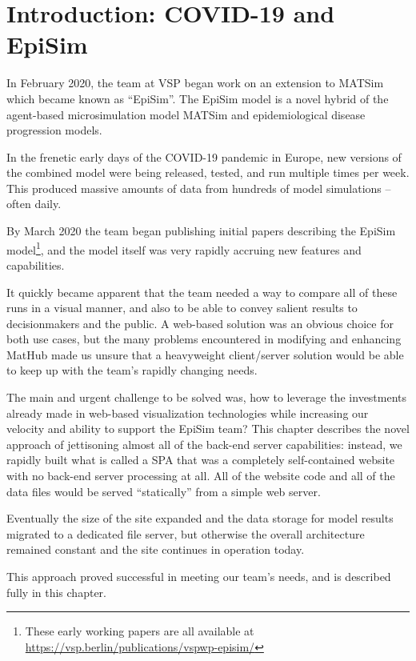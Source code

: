 \hypertarget{covid-introduction-covid-19-and-episim}{%
\section{Introduction: COVID-19 and EpiSim}\label{introduction-covid-19-and-episim}}

In February 2020, the team at VSP began work on an extension to MATSim which became known as ``EpiSim''. The EpiSim model is a novel hybrid of the agent-based microsimulation model MATSim and epidemiological disease progression models.

In the frenetic early days of the COVID-19 pandemic in Europe, new versions of the combined model were being released, tested, and run multiple times per week. This produced massive amounts of data from hundreds of model simulations -- often daily.

By March 2020 the team began publishing initial papers describing the EpiSim model\footnote{These early working papers are all available at \url{https://vsp.berlin/publications/vspwp-episim/}}, and the model itself was very rapidly accruing new features and capabilities.

It quickly became apparent that the team needed a way to compare all of these runs in a visual manner, and also to be able to convey salient results to decisionmakers and the public. A web-based solution was an obvious choice for both use cases, but the many problems encountered in modifying and enhancing MatHub made us unsure that a heavyweight client/server solution would be able to keep up with the team's rapidly changing needs.

The main and urgent challenge to be solved was, how to leverage the investments already made in web-based visualization technologies while increasing our velocity and ability to support the EpiSim team? This chapter describes the novel approach of jettisoning almost all of the back-end server capabilities: instead, we rapidly built what is called a \gls{SPA} that was a completely self-contained website with no back-end server processing at all. All of the website code and all of the data files would be served ``statically'' from a simple web server.

Eventually the size of the site expanded and the data storage for model results migrated to a dedicated file server, but otherwise the overall architecture remained constant and the site continues in operation today.

This approach proved successful in meeting our team's needs, and is described fully in this chapter.

